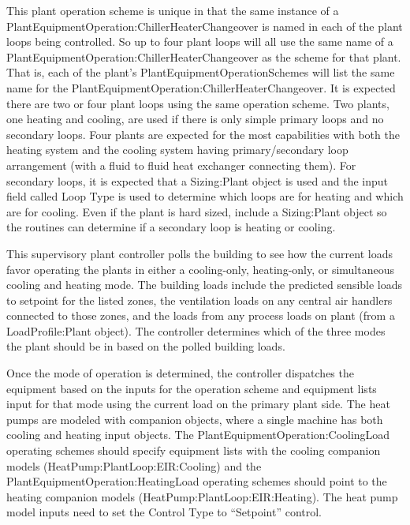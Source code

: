 This plant operation scheme is unique in that the same instance of a PlantEquipmentOperation:ChillerHeaterChangeover is named in each of the plant loops being controlled.  So up to four plant loops will all use the same name of a PlantEquipmentOperation:ChillerHeaterChangeover as the scheme for that plant.  That is, each of the plant's PlantEquipmentOperationSchemes will list the same name for the PlantEquipmentOperation:ChillerHeaterChangeover.  It is expected there are two or four plant loops using the same operation scheme.  Two plants, one heating and cooling, are used if there is only simple primary loops and no secondary loops.  Four plants are expected for the most capabilities with both the heating system and the cooling system having primary/secondary loop arrangement (with a fluid to fluid heat exchanger connecting them).  For secondary loops, it is expected that a Sizing:Plant object is used and the input field called Loop Type is used to determine which loops are for heating and which are for cooling.  Even if the plant is hard sized, include a Sizing:Plant object so the routines can determine if a secondary loop is heating or cooling.  

This supervisory plant controller polls the building to see how the current loads favor operating the plants in either a cooling-only, heating-only, or simultaneous cooling and heating mode.  The building loads include the predicted sensible loads to setpoint for the listed zones, the ventilation loads on any central air handlers connected to those zones, and the loads from any process loads on plant (from a LoadProfile:Plant object).  The controller determines which of the three modes the plant should be in based on the polled building loads. 

Once the mode of operation is determined, the controller dispatches the equipment based on the inputs for the operation scheme and equipment lists input for that mode using the current load on the primary plant side.  The heat pumps are modeled with companion objects, where a single machine has both cooling and heating input objects.  The PlantEquipmentOperation:CoolingLoad operating schemes should specify equipment lists with the cooling companion models (HeatPump:PlantLoop:EIR:Cooling) and the PlantEquipmentOperation:HeatingLoad operating schemes should point to the heating companion models (HeatPump:PlantLoop:EIR:Heating).  The heat pump model inputs need to set the Control Type to ``Setpoint'' control. 

